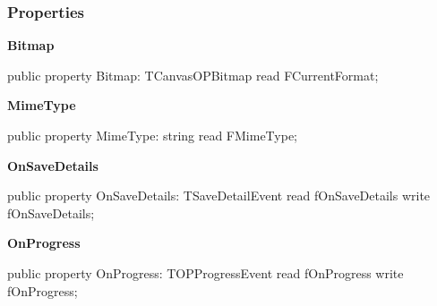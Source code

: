 \documentclass{report}
\newif\ifpdf
\begin{document}
\subsubsection*{\large{\textbf{Properties}}\normalsize\hspace{1ex}\hfill}
\begin{list}{}{
\setlength{\itemindent}{0cm}
\setlength{\listparindent}{0cm}
\setlength{\leftmargin}{\evensidemargin}
\addtolength{\leftmargin}{\tmplength}
\settowidth{\labelsep}{X}
\addtolength{\leftmargin}{\labelsep}
\setlength{\labelwidth}{\tmplength}
}
\label{opbitmapformats.TOPPicture-Bitmap}
\item[\textbf{Bitmap}\hfill]
\ifpdf
\begin{flushleft}
\fi
\begin{ttfamily}
public property Bitmap: TCanvasOPBitmap read FCurrentFormat;\end{ttfamily}

\ifpdf
\end{flushleft}
\fi


\par  \label{opbitmapformats.TOPPicture-MimeType}
\item[\textbf{MimeType}\hfill]
\ifpdf
\begin{flushleft}
\fi
\begin{ttfamily}
public property MimeType: string read FMimeType;\end{ttfamily}

\ifpdf
\end{flushleft}
\fi


\par  \label{opbitmapformats.TOPPicture-OnSaveDetails}
\item[\textbf{OnSaveDetails}\hfill]
\ifpdf
\begin{flushleft}
\fi
\begin{ttfamily}
public property OnSaveDetails: TSaveDetailEvent read fOnSaveDetails write fOnSaveDetails;\end{ttfamily}

\ifpdf
\end{flushleft}
\fi


\par  \label{opbitmapformats.TOPPicture-OnProgress}
\item[\textbf{OnProgress}\hfill]
\ifpdf
\begin{flushleft}
\fi
\begin{ttfamily}
public property OnProgress: TOPProgressEvent read fOnProgress write fOnProgress;\end{ttfamily}

\ifpdf
\end{flushleft}
\fi


\par  \end{list}
\end{document}
